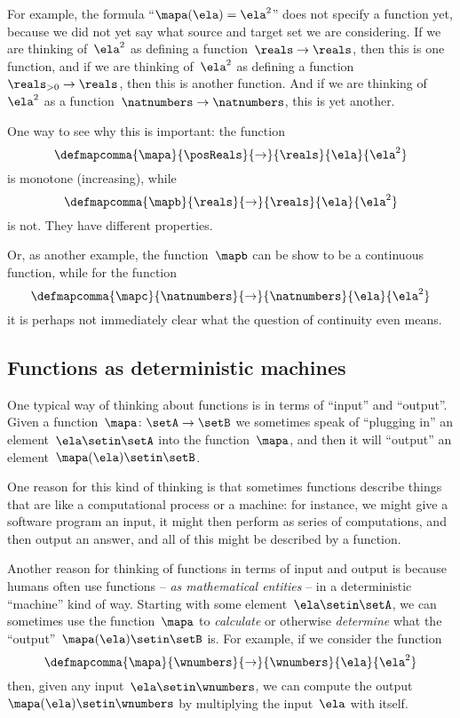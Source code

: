 For example, the formula ``$\mapa(\ela)=\ela^2$'' does not specify a function yet, because we did not yet say what source and target set we are considering.
If we are thinking of~$\ela^2$ as defining a function~$\reals \to \reals$, then this is one function, and if we are thinking of~$\ela^2$ as defining a function~$\reals_{> 0} \to \reals$, then this is another function.
And if we are thinking of~$\ela^2$ as a function~$\natnumbers \to \natnumbers$, this is yet another.

One way to see why this is important: the function
\begin{equation*}
    \defmapcomma{\mapa}{\posReals}{\to}{\reals}{\ela}{\ela^2}
\end{equation*}
is monotone (increasing), while
\begin{equation*}
    \defmapcomma{\mapb}{\reals}{\to}{\reals}{\ela}{\ela^2}
\end{equation*}
is not.
They have different properties.

Or, as another example, the function~$\mapb$ can be show to be a continuous function,
while for the function
\begin{equation*}
    \defmapcomma{\mapc}{\natnumbers}{\to}{\natnumbers}{\ela}{\ela^2}
\end{equation*}
it is perhaps not immediately clear what the question of continuity even means.

\subsection{Functions as deterministic machines}

One typical way of thinking about functions is in terms of ``input'' and ``output''.
Given a function~$\mapa\colon \setA \to \setB$ we sometimes speak of ``plugging in'' an element~$\ela \setin\setA$ into the function~$\mapa$, and then it will ``output'' an element~$\mapa(\ela) \setin\setB$.

One reason for this kind of thinking is that sometimes functions describe things that are like a computational process or a machine:
for instance, we might give a software program an input, it might then perform as series of computations, and then output an answer, and all of this might be described by a function.

Another reason for thinking of functions in terms of input and output is because humans often use functions -- \emph{as mathematical entities} -- in a deterministic ``machine'' kind of way.
Starting with some element~$\ela \setin\setA$, we can sometimes use the function~$\mapa$ to \emph{calculate} or otherwise \emph{determine} what the ``output''~$\mapa(\ela) \setin\setB$ is.
For example, if we consider the function
%
\begin{equation}
    \label{eq:square-function-whole-numbers}
    \defmapcomma{\mapa}{\wnumbers}{\to}{\wnumbers}{\ela}{\ela^2}
\end{equation}
%
then, given any input~$\ela \setin\wnumbers$, we can compute the output~$\mapa(\ela) \setin\wnumbers$ by multiplying the input~$\ela$ with itself.

